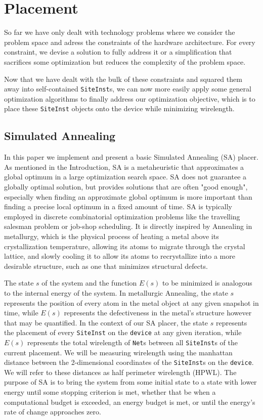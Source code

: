 
\section{Placement}
\label{sec:placement}
So far we have only dealt with technology problems where we consider the problem space and adress the constraints of the hardware architecture. 
For every constraint, we devise a solution to fully address it or a simplification that sacrifices some optimization but reduces the complexity of the problem space. 

Now that we have dealt with the bulk of these constraints and squared them away into self-contained \texttt{SiteInst}s, we can now more easily apply some general optimization algorithms to finally address our optimization objective, which is to place these \texttt{SiteInst} objects onto the device while minimizing wirelength. 

\subsection{Simulated Annealing}
\label{subsec:simulated_annealing}

In this paper we implement and present a basic Simulated Annealing (SA) placer. 
As mentioned in the Introduction, SA is a metaheuristic that approximates a global optimum in a large optimization search space. 
SA does not guarantee a globally optimal solution, but provides solutions that are often "good enough", especially when finding an approximate global optimum is more important than finding a precise local optimum in a fixed amount of time. 
SA is typically employed in discrete combinatorial optimization problems like the travelling salesman problem or job-shop scheduling. 
It is directly inspired by Annealing in metallurgy, which is the physical process of heating a metal above its crystallization temperature, allowing its atoms to migrate through the crystal lattice, and slowly cooling it to allow its atoms to recrystallize into a more desirable structure, such as one that minimizes structural defects. 

The state \(s\) of the system and the function \(E(s)\) to be minimized is analogous to the internal energy of the system. 
In metallurgic Annealing, the state \(s\) represents the position of every atom in the metal object at any given snapshot in time, while \(E(s)\) represents the defectiveness in the metal's structure however that may be quantified. 
In the context of our SA placer, the state \(s\) represents the placement of every \texttt{SiteInst} on the \texttt{device} at any given iteration, while \(E(s)\) represents the total wirelength of \texttt{Net}s between all \texttt{SiteInst}s of the current placement.
We will be measuring wirelength using the manhattan distance between the 2-dimensional coordinates of the \texttt{SiteInst}s on the \texttt{device}.
We will refer to these distances as half perimeter wirelength (HPWL).
The purpose of SA is to bring the system from some initial state to a state with lower energy until some stopping criterion is met, whether that be when a computational budget is exceeded, an energy budget is met, or until the energy's rate of change approaches zero. 


